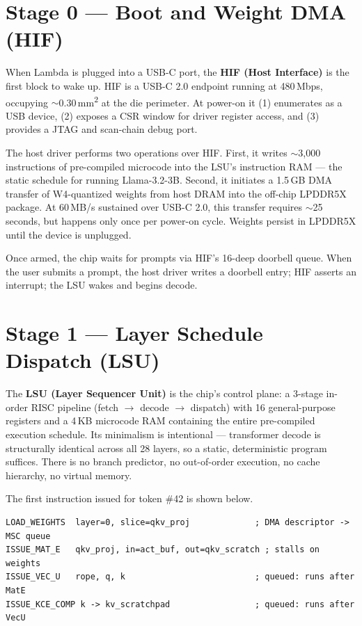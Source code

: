 \documentclass[11pt,letterpaper]{article}
\begin{document}
\section{Stage 0 --- Boot and Weight DMA (HIF)}

When Lambda is plugged into a USB-C port, the \textbf{HIF (Host Interface)} is the first
block to wake up. HIF is a USB-C 2.0 endpoint running at 480\,Mbps, occupying $\sim$0.30\,mm\textsuperscript{2}
at the die perimeter. At power-on it (1) enumerates as a USB device, (2) exposes a CSR
window for driver register access, and (3) provides a JTAG and scan-chain debug port.

The host driver performs two operations over HIF. First, it writes $\sim$3{,}000 instructions of
pre-compiled microcode into the LSU's instruction RAM --- the static schedule for running
Llama-3.2-3B. Second, it initiates a 1.5\,GB DMA transfer of W4-quantized weights from host
DRAM into the off-chip LPDDR5X package. At 60\,MB/s sustained over USB-C 2.0, this transfer
requires $\sim$25 seconds, but happens only once per power-on cycle. Weights persist in
LPDDR5X until the device is unplugged.

Once armed, the chip waits for prompts via HIF's 16-deep doorbell queue. When the user
submits a prompt, the host driver writes a doorbell entry; HIF asserts an interrupt; the LSU
wakes and begins decode.

\section{Stage 1 --- Layer Schedule Dispatch (LSU)}

The \textbf{LSU (Layer Sequencer Unit)} is the chip's control plane: a 3-stage in-order RISC
pipeline (fetch $\to$ decode $\to$ dispatch) with 16 general-purpose registers and a 4\,KB
microcode RAM containing the entire pre-compiled execution schedule. Its minimalism is
intentional --- transformer decode is structurally identical across all 28 layers, so a
static, deterministic program suffices. There is no branch predictor, no out-of-order
execution, no cache hierarchy, no virtual memory.

The first instruction issued for token \#42 is shown below.

\begin{lstlisting}
LOAD_WEIGHTS  layer=0, slice=qkv_proj             ; DMA descriptor -> MSC queue
ISSUE_MAT_E   qkv_proj, in=act_buf, out=qkv_scratch ; stalls on weights
ISSUE_VEC_U   rope, q, k                          ; queued: runs after MatE
ISSUE_KCE_COMP k -> kv_scratchpad                 ; queued: runs after VecU
\end{lstlisting}
\end{document}
